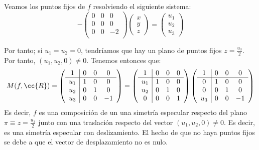 \begin{enumerate}
\begin{enumerate}
        Veamos los puntos fijos de $f$ resolviendo el siguiente sistema:
        \begin{equation*}
            -\left(\begin{array}{ccc}
                0 & 0 & 0 \\
                0 & 0 & 0 \\
                0 & 0 & -2 \\
            \end{array}\right)
            \left(\begin{array}{c}
                x\\y\\z
            \end{array}\right)
            = \left(\begin{array}{c}
                u_1\\u_2\\u_3
            \end{array}\right)
        \end{equation*}

        Por tanto; si $u_1=u_2=0$, tendríamos que hay un plano de puntos fijos $z=\frac{u_3}{2}$. Por tanto, $(u_1,u_2,0)\neq 0$. Tenemos entonces que:
        \begin{equation*}
            M(f,\cc{R}) = \left(\begin{array}{c|ccc}
                1 & 0 & 0 & 0 \\ \hline
                u_1 & 1 & 0 & 0 \\
                u_2 & 0 & 1 & 0 \\
                u_3 & 0 & 0 & -1 \\
            \end{array}\right)
            = \left(\begin{array}{c|ccc}
                1 & 0 & 0 & 0 \\ \hline
                u_1 & 1 & 0 & 0 \\
                u_2 & 0 & 1 & 0 \\
                0 & 0 & 0 & 1 \\
            \end{array}\right)
            \left(\begin{array}{c|ccc}
                1 & 0 & 0 & 0 \\ \hline
                0 & 1 & 0 & 0 \\
                0 & 0 & 1 & 0 \\
                u_3 & 0 & 0 & -1 \\
            \end{array}\right)
        \end{equation*}
        Es decir, $f$ es una composición de un una simetría especular respecto del plano $\pi\equiv z=\frac{u_3}{2}$ junto con una traslación respecto del vector $(u_1,u_2,0)\neq 0$. Es decir, es una simetría especular con deslizamiento. El hecho de que no haya puntos fijos se debe a que el vector de desplazamiento no es nulo.
    \end{enumerate}


\end{enumerate}
